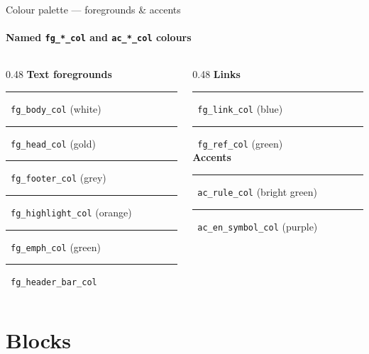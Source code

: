 \documentclass[sans,numeric,titlesplit]{qslides}
\begin{document}
\begin{frame}{Colour palette --- foregrounds \& accents}
  \framesubtitle{Named \texttt{fg\_*\_col} and \texttt{ac\_*\_col} colours}
  \begin{columns}[onlytextwidth,T]
    \begin{column}{0.48\linewidth}
      \textbf{Text foregrounds}\\[0.5ex]
      {\color{fg_body_col}\rule{0.9em}{1.2ex}}\ \texttt{fg\_body\_col} (white)\\[0.3ex]
      {\color{fg_head_col}\rule{0.9em}{1.2ex}}\ \texttt{fg\_head\_col} (gold)\\[0.3ex]
      {\color{fg_footer_col}\rule{0.9em}{1.2ex}}\ \texttt{fg\_footer\_col} (grey)\\[0.3ex]
      {\color{fg_highlight_col}\rule{0.9em}{1.2ex}}\ \texttt{fg\_highlight\_col} (orange)\\[0.3ex]
      {\color{fg_emph_col}\rule{0.9em}{1.2ex}}\ \texttt{fg\_emph\_col} (green)\\[0.3ex]
      {\color{fg_header_bar_col}\rule{0.9em}{1.2ex}}\ \texttt{fg\_header\_bar\_col}
    \end{column}
    \begin{column}{0.48\linewidth}
      \textbf{Links}\\[0.5ex]
      {\color{fg_link_col}\rule{0.9em}{1.2ex}}\ \texttt{fg\_link\_col} (blue)\\[0.3ex]
      {\color{fg_ref_col}\rule{0.9em}{1.2ex}}\ \texttt{fg\_ref\_col} (green)\\[1.5ex]
      \textbf{Accents}\\[0.5ex]
      {\color{ac_rule_col}\rule{0.9em}{1.2ex}}\ \texttt{ac\_rule\_col} (bright green)\\[0.3ex]
      {\color{ac_en_symbol_col}\rule{0.9em}{1.2ex}}\ \texttt{ac\_en\_symbol\_col} (purple)
    \end{column}
  \end{columns}
\end{frame}

\section{Blocks}
\end{document}
